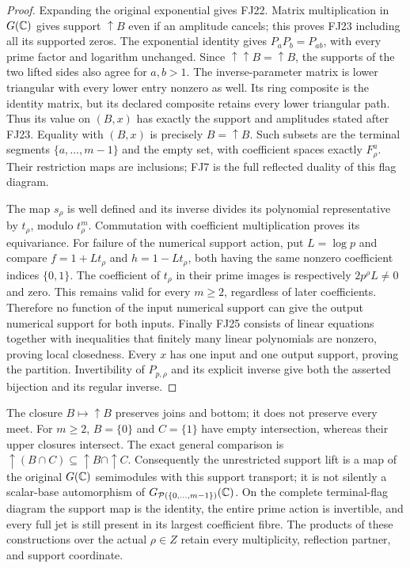 \begin{proof}
Expanding the original exponential gives FJ22. Matrix multiplication
in $G(\mathbb C)$ gives support $\uparrow B$ even if an amplitude cancels;
this proves FJ23 including all its supported zeros. The exponential
identity gives $P_aP_b=P_{ab}$, with every prime factor and logarithm
unchanged. Since $\uparrow\uparrow B=\uparrow B$, the supports of
the two lifted sides also agree for $a,b>1$. The inverse-parameter
matrix is lower triangular with every lower entry nonzero as well.
Its ring composite is the identity matrix, but its declared composite
retains every lower triangular path. Thus its value on $(B,x)$ has
exactly the support and amplitudes stated after FJ23. Equality with
$(B,x)$ is precisely $B=\uparrow B$. Such subsets are the terminal
segments $\{a,\ldots,m-1\}$ and the empty set, with coefficient
spaces exactly $F^a_\rho$. Their restriction maps are inclusions;
FJ7 is the full reflected duality of this flag diagram.

The map $s_\rho$ is well defined and its inverse divides its polynomial
representative by $t_\rho$, modulo $t_\rho^m$. Commutation with
coefficient multiplication proves its equivariance. For failure of
the numerical support action, put $L=\log p$ and compare
$f=1+Lt_\rho$ and $h=1-Lt_\rho$, both having the same nonzero
coefficient indices $\{0,1\}$. The coefficient of $t_\rho$ in their
prime images is respectively $2p^\rho L\ne0$ and zero. This remains
valid for every $m\ge2$, regardless of later coefficients.
Therefore no function of the input numerical support can give the
output numerical support for both inputs.
Finally FJ25 consists of linear equations together with inequalities
that finitely many linear polynomials are nonzero, proving local
closedness. Every $x$ has one input and one output support, proving
the partition. Invertibility of $P_{p,\rho}$ and its explicit inverse
give both the asserted bijection and its regular inverse.
\end{proof}

The closure $B\mapsto\uparrow B$ preserves joins and bottom; it
does not preserve every meet. For $m\ge2$, $B=\{0\}$ and
$C=\{1\}$ have empty intersection, whereas their upper closures
intersect. The exact general comparison is
$\uparrow(B\cap C)\subseteq\uparrow B\cap\uparrow C$.
Consequently the unrestricted support lift is a map of the original
$G(\mathbb C)$ semimodules with this support transport; it is not silently
a scalar-base automorphism of $G_{\mathcal P(\{0,\ldots,m-1\})}(\mathbb C)$.
On the complete terminal-flag diagram the support map is the identity,
the entire prime action is invertible, and every full jet is still
present in its largest coefficient fibre. The products of these
constructions over the actual $\rho\in Z$ retain every multiplicity,
reflection partner, and support coordinate.


